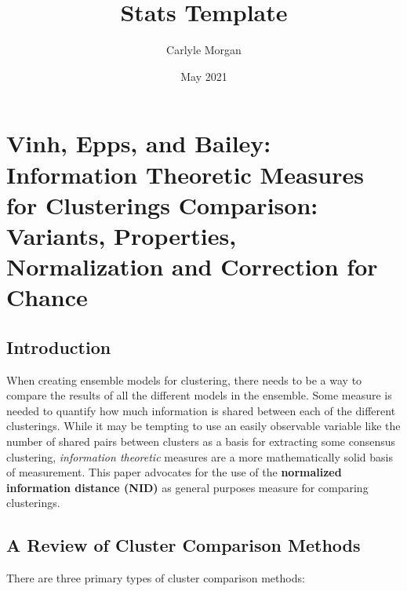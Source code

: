 \documentclass{article}
\title{Stats Template}
\author{Carlyle Morgan}
\date{May 2021}
\begin{document}
\section{Vinh, Epps, and Bailey: Information Theoretic Measures for Clusterings Comparison:
Variants, Properties, Normalization and Correction for Chance}

\subsection{Introduction}

When creating ensemble models for clustering, there needs to be a way to compare the results of all the different models in the ensemble. Some measure is needed to quantify how much information is shared between each of the different clusterings. While it may be tempting to use an easily observable variable like the number of shared pairs between clusters as a basis for extracting some consensus clustering, \textit{information theoretic} measures are a more mathematically solid basis of measurement. This paper advocates for the use of the \textbf{normalized information distance (NID)} as general purposes measure for comparing clusterings.

\subsection{A Review of Cluster Comparison Methods}

There are three primary types of cluster comparison methods:
\end{document}
